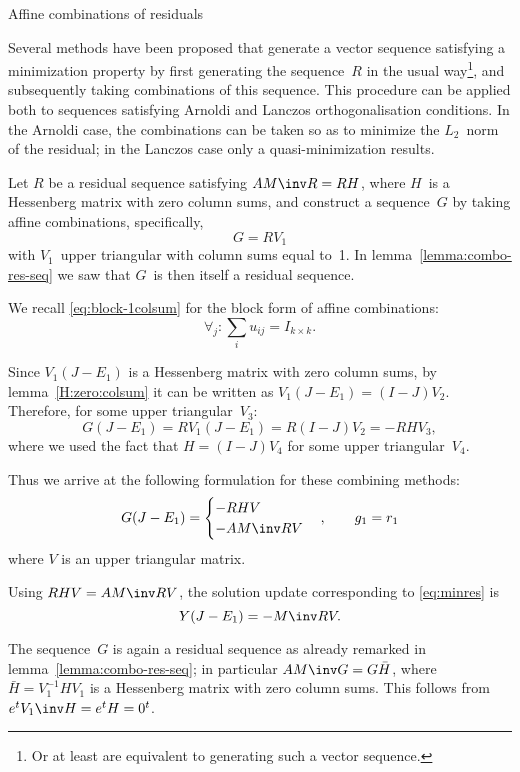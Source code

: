 \documentclass[11pt]{artikel3}
\begin{document}
\begin{Outline}

 {Affine combinations of residuals}
\label{sec:affine-res}

Several methods have been proposed that generate a vector sequence
satisfying a minimization property by first generating the
sequence~$R$ in the usual way\footnote
{Or at least are equivalent to generating such a vector sequence.},
and subsequently taking combinations of this sequence.
This procedure can be applied both to sequences satisfying Arnoldi
and Lanczos orthogonalisation conditions.
In the Arnoldi case, the combinations can be taken so as to
minimize the $L_2$~norm of the residual; 
in the Lanczos case only a quasi-minimization results.

Let $R$ be a residual sequence satisfying $AM\inv R=RH$,
where $H$~is a Hessenberg matrix with zero column sums,
and construct a sequence~$G$ by taking
affine combinations, specifically, \[G=RV_1\]
with $V_1$~upper triangular with column sums equal to~1.
In lemma~\ref{lemma:combo-res-seq} we saw
that $G$~is then itself a residual sequence.

\begin{block}
We recall \eqref{eq:block-1colsum} for the block form of affine combinations:
\[ \forall_j\colon \sum_iu_{ij}=I_{k\times k}. \]
\end{block}

Since $V_1(J-E_1)$ is a Hessenberg matrix with zero
column sums, by lemma~\ref{H:zero:colsum} it can be written as
$V_1(J-E_1)=(I-J)V_2$. Therefore, for some upper triangular~$V_3$:
  \[ G(J-E_1)=RV_1(J-E_1)=R(I-J)V_2=-RHV_3, \]
where we used the fact that $H=(I-J)V_4$ for some upper triangular~$V_4$.

Thus we arrive at the following formulation for these combining methods:
\begin{equation}
        G(J-E_1)=\begin{cases}-RHV\cr -AM\inv RV\cr\end{cases},\qquad g_1=r_1
        \label{eq:minres}\end{equation}
where $V$ is an upper triangular matrix.

Using $RHV=AM\inv RV$, 
the solution update corresponding to \eqref{eq:minres} is
\begin{equation} Y(J-E_1)=-M\inv RV. \label{eq:minres-x}\end{equation}

The sequence~$G$ is again a residual sequence as already remarked in
lemma~\ref{lemma:combo-res-seq}; in particular $AM\inv G=G\bar H$,
where $\bar H=V_1^{-1}HV_1$ is a Hessenberg matrix with zero column
sums. This follows from $e^tV_1\inv H=e^tH=0^t$.


\end{Outline}
\end{document}
